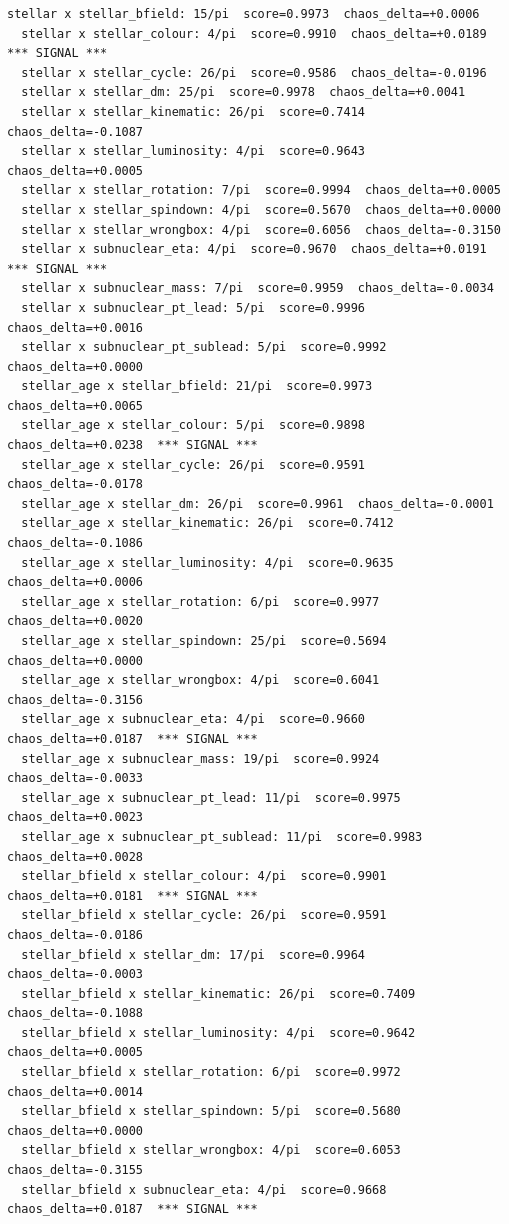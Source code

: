 \documentclass[11pt, letterpaper, openany]{book}
\begin{document}
\begin{empiricalbox}
\begin{lstlisting}[style=terminal]
  stellar x stellar_bfield: 15/pi  score=0.9973  chaos_delta=+0.0006
  stellar x stellar_colour: 4/pi  score=0.9910  chaos_delta=+0.0189  *** SIGNAL ***
  stellar x stellar_cycle: 26/pi  score=0.9586  chaos_delta=-0.0196
  stellar x stellar_dm: 25/pi  score=0.9978  chaos_delta=+0.0041
  stellar x stellar_kinematic: 26/pi  score=0.7414  chaos_delta=-0.1087
  stellar x stellar_luminosity: 4/pi  score=0.9643  chaos_delta=+0.0005
  stellar x stellar_rotation: 7/pi  score=0.9994  chaos_delta=+0.0005
  stellar x stellar_spindown: 4/pi  score=0.5670  chaos_delta=+0.0000
  stellar x stellar_wrongbox: 4/pi  score=0.6056  chaos_delta=-0.3150
  stellar x subnuclear_eta: 4/pi  score=0.9670  chaos_delta=+0.0191  *** SIGNAL ***
  stellar x subnuclear_mass: 7/pi  score=0.9959  chaos_delta=-0.0034
  stellar x subnuclear_pt_lead: 5/pi  score=0.9996  chaos_delta=+0.0016
  stellar x subnuclear_pt_sublead: 5/pi  score=0.9992  chaos_delta=+0.0000
  stellar_age x stellar_bfield: 21/pi  score=0.9973  chaos_delta=+0.0065
  stellar_age x stellar_colour: 5/pi  score=0.9898  chaos_delta=+0.0238  *** SIGNAL ***
  stellar_age x stellar_cycle: 26/pi  score=0.9591  chaos_delta=-0.0178
  stellar_age x stellar_dm: 26/pi  score=0.9961  chaos_delta=-0.0001
  stellar_age x stellar_kinematic: 26/pi  score=0.7412  chaos_delta=-0.1086
  stellar_age x stellar_luminosity: 4/pi  score=0.9635  chaos_delta=+0.0006
  stellar_age x stellar_rotation: 6/pi  score=0.9977  chaos_delta=+0.0020
  stellar_age x stellar_spindown: 25/pi  score=0.5694  chaos_delta=+0.0000
  stellar_age x stellar_wrongbox: 4/pi  score=0.6041  chaos_delta=-0.3156
  stellar_age x subnuclear_eta: 4/pi  score=0.9660  chaos_delta=+0.0187  *** SIGNAL ***
  stellar_age x subnuclear_mass: 19/pi  score=0.9924  chaos_delta=-0.0033
  stellar_age x subnuclear_pt_lead: 11/pi  score=0.9975  chaos_delta=+0.0023
  stellar_age x subnuclear_pt_sublead: 11/pi  score=0.9983  chaos_delta=+0.0028
  stellar_bfield x stellar_colour: 4/pi  score=0.9901  chaos_delta=+0.0181  *** SIGNAL ***
  stellar_bfield x stellar_cycle: 26/pi  score=0.9591  chaos_delta=-0.0186
  stellar_bfield x stellar_dm: 17/pi  score=0.9964  chaos_delta=-0.0003
  stellar_bfield x stellar_kinematic: 26/pi  score=0.7409  chaos_delta=-0.1088
  stellar_bfield x stellar_luminosity: 4/pi  score=0.9642  chaos_delta=+0.0005
  stellar_bfield x stellar_rotation: 6/pi  score=0.9972  chaos_delta=+0.0014
  stellar_bfield x stellar_spindown: 5/pi  score=0.5680  chaos_delta=+0.0000
  stellar_bfield x stellar_wrongbox: 4/pi  score=0.6053  chaos_delta=-0.3155
  stellar_bfield x subnuclear_eta: 4/pi  score=0.9668  chaos_delta=+0.0187  *** SIGNAL ***

\end{lstlisting}
\end{empiricalbox}
\end{document}
